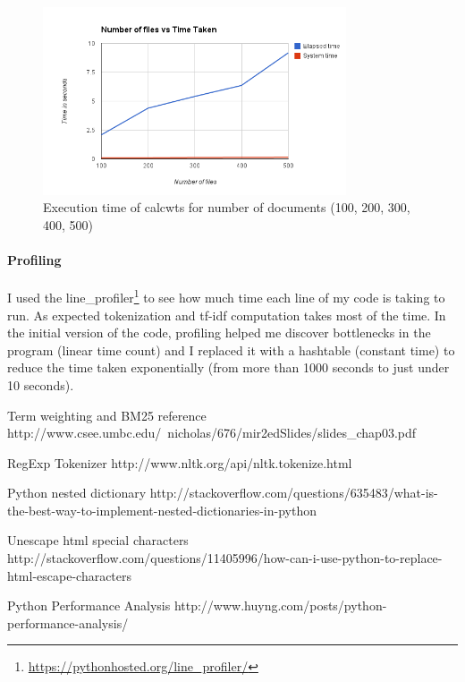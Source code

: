 \documentclass[paper=a4, fontsize=11pt]{scrartcl}
\numberwithin{equation}{section}		%
\numberwithin{figure}{section}			%
\numberwithin{table}{section}				%
\begin{document}
\begin{figure}[h] %
  \begin{center}
    \includegraphics[width=0.8\textwidth]{100chart.png}
  \end{center}
  \caption{Execution time of calcwts for number of documents (100, 200, 300, 400, 500)}
\end{figure}

\paragraph{Profiling}

I used the line\_profiler\footnote{\url{https://pythonhosted.org/line_profiler/}} to see how much time each line of my code is taking to run. As expected tokenization and tf-idf computation takes most of the time. In the initial version of the code, profiling helped me discover bottlenecks in the program (linear time count) and I replaced it with a hashtable (constant time) to reduce the time taken exponentially (from more than 1000 seconds to just under 10 seconds).

\begin{thebibliography}{1}

 Term weighting and BM25 reference http://www.csee.umbc.edu/~nicholas/676/mir2edSlides/slides\_chap03.pdf

 RegExp Tokenizer http://www.nltk.org/api/nltk.tokenize.html

 Python nested dictionary http://stackoverflow.com/questions/635483/what-is-the-best-way-to-implement-nested-dictionaries-in-python
  
   Unescape html special characters http://stackoverflow.com/questions/11405996/how-can-i-use-python-to-replace-html-escape-characters

   Python Performance Analysis http://www.huyng.com/posts/python-performance-analysis/

  \end{thebibliography}

\end{document}
